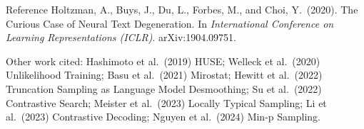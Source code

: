 \documentclass[aspectratio=169,11pt]{beamer}
\begin{document}
\begin{frame}{Reference}
  \small
  Holtzman, A., Buys, J., Du, L., Forbes, M., and Choi, Y.\ (2020). The Curious Case of Neural Text Degeneration. In \emph{International Conference on Learning Representations (ICLR)}. arXiv:1904.09751.
  \vspace{3mm}

  {\footnotesize Other work cited: Hashimoto et al.\ (2019) HUSE; Welleck et al.\ (2020) Unlikelihood Training; Basu et al.\ (2021) Mirostat; Hewitt et al.\ (2022) Truncation Sampling as Language Model Desmoothing; Su et al.\ (2022) Contrastive Search; Meister et al.\ (2023) Locally Typical Sampling; Li et al.\ (2023) Contrastive Decoding; Nguyen et al.\ (2024) Min-p Sampling.}
\end{frame}
\end{document}
